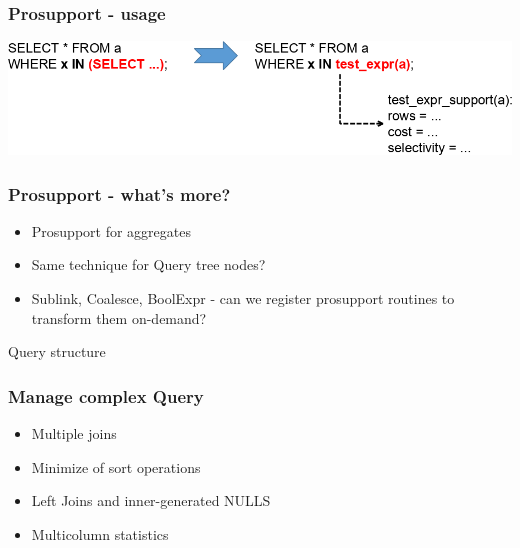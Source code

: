 \documentclass{beamer}
\begin{document}
\begin{frame}[fragile]\frametitle{Prosupport - usage}
\centerline{\includegraphics[scale=0.45]{pics/prosupport.png}}
\end{frame}

\begin{frame}[fragile]\frametitle{Prosupport - what's more?}
\begin{itemize}
  \item Prosupport for aggregates
  \item Same technique for Query tree nodes?
  \item Sublink, Coalesce, BoolExpr - can we register prosupport routines to transform them on-demand?
\end{itemize}
\end{frame}


\begin{frame}
\vspace*{\fill}
\begin{center}
Query structure
\end{center}
\vspace*{\fill}
\end{frame}

\begin{frame}[fragile]\frametitle{Manage complex Query}
\begin{itemize}
  \item Multiple joins
  \item Minimize of sort operations
  \item Left Joins and inner-generated NULLS
  \item Multicolumn statistics
\end{itemize}
\end{frame}
\end{document}
